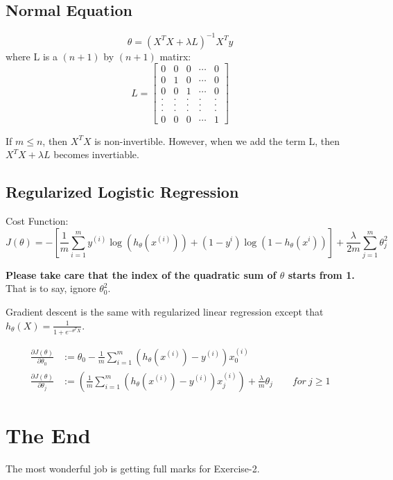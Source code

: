 \documentclass[11pt]{article}
\begin{document}
		\subsection{Normal Equation}
		$$\theta = ( X^{T}X + \lambda L )^{-1} X^{T}y$$
		where L is a $(n+1)$ by $(n+1)$ matirx:
		$$L=\left[
			\begin{array}{ccccc}
				0 & 0 & 0 & \cdots & 0 \\
				0 & 1 & 0 & \cdots & 0 \\
				0 & 0 & 1 & \cdots & 0 \\
				. & . & . & . & . \\
				. & . & . & . & . \\
				. & . & . & . & . \\
				0 & 0 & 0 & \cdots & 1
			\end{array}
		\right]$$
		
		If $m \leq n$, then $X^{T}X$ is non-invertible. However, when we add the term L, then $X^{T}X + \lambda L$ becomes invertiable.
		
		\subsection{Regularized Logistic Regression}
		
		Cost Function:
		$$
		J(\theta) =- \left[ \frac{1}{m} \sum_{i=1}^{m} y^{(i)}\log(h_{\theta}(x^{(i)})) + (1-y^{i})\log (1-h_{\theta}(x^{i}))\right] + \frac{\lambda}{2m}\sum_{j=1}^{m}\theta_{j}^2
		$$
		
		\textbf{Please take care that the index of the quadratic sum of $\theta$ starts from 1.} That is to say, ignore $\theta_{0}^2$.
		
		Gradient descent is the same with regularized linear regression except that $h_{\theta}(X) = \frac{1}{1+e^{-\theta^{T} X}}$.
		
		\begin{center}
			\begin{align}
			\frac{\partial J(\theta)}{\partial\theta_0} &:= \theta_{0} - \frac{1}{m} \sum_{i=1}^{m}( h_{\theta}(x^{(i)}) - y^{(i)} ) x_{0}^{(i)}\\
			\frac{\partial J(\theta)}{\partial\theta_j} &:= \left( \frac{1}{m} \sum_{i=1}^{m}(h_{\theta}(x^{(i)}) - y^{(i)})x_{j}^{(i)} \right) + \frac{\lambda}{m} \theta_{j} \qquad for\ j \geq 1
			\end{align}
		\end{center}
		
	\section{The End} 
		The most wonderful job is getting full marks for Exercise-2.
\end{document}
